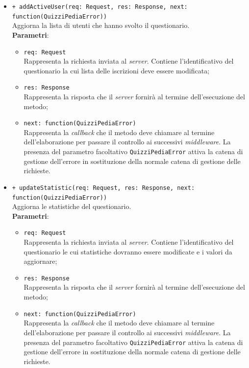 \begin{itemize}
\begin{itemize}
		\item \texttt{+ addActiveUser(req: Request, res: Response, next: function(QuizziPediaError))}\\
		Aggiorna la lista di utenti che hanno svolto il questionario.\\
		\textbf{Parametri}:
		\begin{itemize}
			\item \texttt{req: Request}\\
			Rappresenta la richiesta inviata al \textit{server}. Contiene l'identificativo del questionario la cui lista delle iscrizioni deve essere modificata;
			\item \texttt{res: Response}\\
			Rappresenta la risposta che il \textit{server} fornirà al termine dell'esecuzione del metodo;
			\item \texttt{next: function(QuizziPediaError)}\\
			Rappresenta la \textit{callback} che il metodo deve chiamare al termine dell'elaborazione per passare il controllo ai successivi \textit{middleware}. La presenza del parametro facoltativo \texttt{QuizziPediaError} attiva la catena di gestione dell'errore in sostituzione della normale catena di gestione delle richieste.
		\end{itemize}
		
		\item \texttt{+ updateStatistic(req: Request, res: Response, next: function(QuizziPediaError))}\\
		Aggiorna le statistiche del questionario.\\
		\textbf{Parametri}:
		\begin{itemize}
			\item \texttt{req: Request}\\
			Rappresenta la richiesta inviata al \textit{server}. Contiene l'identificativo del questionario le cui statistiche dovranno essere modificate e i valori da aggiornare;
			\item \texttt{res: Response}\\
			Rappresenta la risposta che il \textit{server} fornirà al termine dell'esecuzione del metodo;
			\item \texttt{next: function(QuizziPediaError)}\\
			Rappresenta la \textit{callback} che il metodo deve chiamare al termine dell'elaborazione per passare il controllo ai successivi \textit{middleware}. La presenza del parametro facoltativo \texttt{QuizziPediaError} attiva la catena di gestione dell'errore in sostituzione della normale catena di gestione delle richieste.
		\end{itemize}
		

\end{itemize}
\end{itemize}
